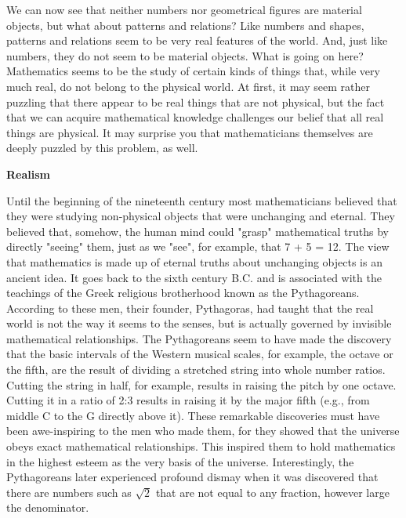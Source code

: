      We can now see that neither numbers nor geometrical figures are material objects, but what about patterns and relations?  Like numbers and shapes, patterns and relations seem to be very real features of the world.  And, just like numbers, they do not seem to be material objects.  What is going on here?  Mathematics seems to be the study of certain kinds of things that, while very much real, do not belong to the physical world.  At first, it may seem rather puzzling that there appear to be real things that are not physical, but the fact that we can acquire mathematical knowledge challenges our belief that all real things are physical.  It may surprise you that mathematicians themselves are deeply puzzled by this problem, as well.  

\noindent
\textbf{Realism}

     Until the beginning of the nineteenth century most mathematicians believed that they were studying non-physical objects that were unchanging and eternal.  They believed that, somehow, the human mind could "grasp" mathematical truths by directly "seeing" them, just as we "see", for example, that 7 + 5 = 12.  The view that mathematics is made up of eternal truths about unchanging objects is an ancient idea.  It goes back to the sixth century B.C. and is associated with the teachings of the Greek religious brotherhood known as the Pythagoreans.  According to these men, their founder, Pythagoras, had taught that the real world is not the way it seems to the senses, but is actually governed by invisible mathematical relationships.  The Pythagoreans seem to have made the discovery that the basic intervals of the Western musical scales, for example, the octave or the fifth, are the result of dividing a stretched string into whole number ratios.  Cutting the string in half, for example, results in raising the pitch by one octave.  Cutting it in a ratio of 2:3 results in raising it by the major fifth (e.g., from middle C to the G directly above it).  These remarkable discoveries must have been awe-inspiring to the men who made them, for they showed that the universe obeys exact mathematical relationships.  This inspired them to hold mathematics in the highest esteem as the very basis of the universe.  Interestingly, the Pythagoreans later experienced profound dismay when it was discovered that there are numbers such as $\sqrt{2}$   that are not equal to any fraction, however large the denominator.
     
